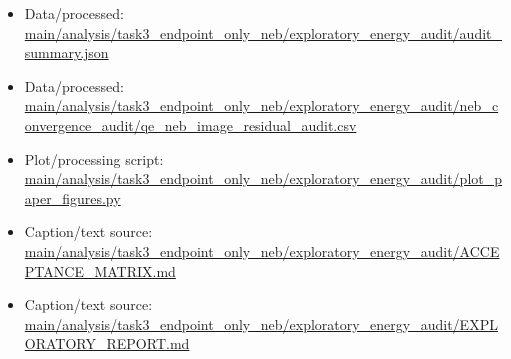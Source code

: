 \begin{itemize}[leftmargin=1.4em,noitemsep]
\item Data/processed: \begingroup\scriptsize\url{main/analysis/task3_endpoint_only_neb/exploratory_energy_audit/audit_summary.json}\endgroup
\item Data/processed: \begingroup\scriptsize\url{main/analysis/task3_endpoint_only_neb/exploratory_energy_audit/neb_convergence_audit/qe_neb_image_residual_audit.csv}\endgroup
\item Plot/processing script: \begingroup\scriptsize\url{main/analysis/task3_endpoint_only_neb/exploratory_energy_audit/plot_paper_figures.py}\endgroup
\item Caption/text source: \begingroup\scriptsize\url{main/analysis/task3_endpoint_only_neb/exploratory_energy_audit/ACCEPTANCE_MATRIX.md}\endgroup
\item Caption/text source: \begingroup\scriptsize\url{main/analysis/task3_endpoint_only_neb/exploratory_energy_audit/EXPLORATORY_REPORT.md}\endgroup
\end{itemize}
